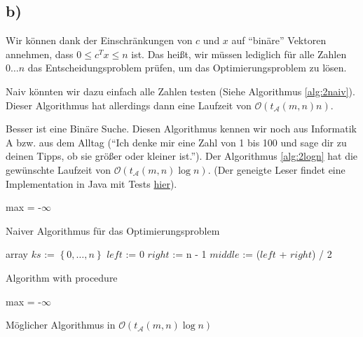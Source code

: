 \documentclass{article}
\begin{document}
\subsection*{b)}
Wir können dank der Einschränkungen von $c$ und $x$ auf "`binäre"' Vektoren annehmen, dass $0 \leq c^Tx \leq n$ ist.
Das heißt, wir müssen lediglich für alle Zahlen $0\dots n$ das Entscheidungsproblem prüfen, um das Optimierungsproblem zu lösen. 

Naiv könnten wir dazu einfach alle Zahlen testen (Siehe Algorithmus \ref{alg:2naiv}). Dieser Algorithmus hat allerdings dann eine Laufzeit von $\mathcal{O}\left(t_\mathcal{A}\left(m,n\right)n\right)$.

Besser ist eine Binäre Suche. Diesen Algorithmus kennen wir noch aus Informatik A bzw. aus dem Alltag ("`Ich denke mir eine Zahl von 1 bis 100 und sage dir zu deinen Tipps, ob sie größer oder kleiner ist."'). Der Algorithmus \ref{alg:2logn} hat die gewünschte Laufzeit von $\mathcal{O}\left(t_\mathcal{A}\left(m,n\right)\log{n}\right)$. (Der geneigte Leser findet eine Implementation in Java mit Tests \href{http://uni.sebastian-hoeffner.de/DInf/DInf14102b.java}{hier}).

\begin{algorithm}[!ht]
\DontPrintSemicolon
max = -$\infty$\;
\;
\label{alg:2naiv}
\caption{Naiver Algorithmus für das Optimierungsproblem}
\end{algorithm}


\begin{algorithm}[!ht]
  \DontPrintSemicolon
  array $ks$ := $\left\{0, \dots, n\right\}$\;
  $left$     := 0\;
  $right$    := n - 1\;
  $middle$   := ($left$ + $right$) / 2\;
  \caption{Algorithm with procedure}
\end{algorithm} 
\begin{algorithm}
max = -$\infty$\;
\;
\;
\label{alg:2logn}
\caption{Möglicher Algorithmus in $\mathcal{O}\left(t_\mathcal{A}\left(m,n\right)\log{n}\right)$}
\end{algorithm}
\end{document}
